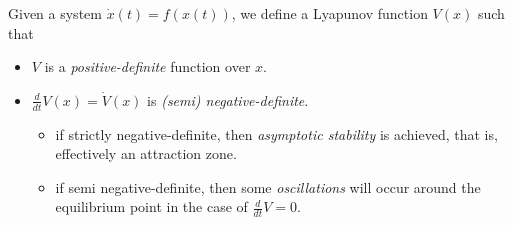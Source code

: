  Given a system $\dot{x}(t)=f\left( x(t) \right) $, we define a Lyapunov function $V\left( x \right) $ such that
\begin{itemize}
    \item $V$ is a \emph{positive-definite} function over $x$.
    \item $\frac{d}{dt}V\left( x \right) =\dot{V}\left( x \right)$ is \emph{(semi) negative-definite}.
	\begin{itemize}
	    \item if strictly negative-definite, then \emph{asymptotic stability} is achieved, that is, effectively an attraction zone.
	    \item if semi negative-definite, then some \emph{oscillations} will occur around the equilibrium point in the case of $\frac{d}{dt}V = 0$.
	\end{itemize}
\end{itemize}

